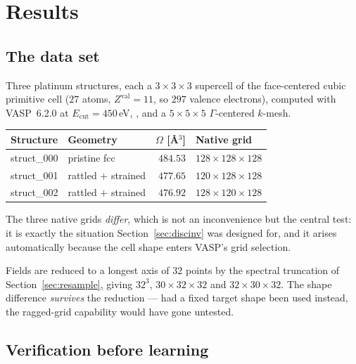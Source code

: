 \chapter{Results}
\label{ch:results}

\section{The data set}

Three platinum structures, each a $3\times3\times3$ supercell of the face-centered
cubic primitive cell ($27$ atoms, $Z^{\mathrm{val}}=11$, so $297$ valence
electrons), computed with VASP~6.2.0 at
$E_{\mathrm{cut}}=450$\,eV, , and a $5\times5\times5$
$\Gamma$-centered $k$-mesh.

\begin{center}
\begin{tabular}{@{}llrl@{}}
\toprule
Structure & Geometry & $\Omega$ [\AA$^3$] & Native grid \\
\midrule
struct\_000 & pristine fcc & $484.53$ & $128\times128\times128$ \\
struct\_001 & rattled $+$ strained & $477.65$ & $120\times128\times128$ \\
struct\_002 & rattled $+$ strained & $476.92$ & $128\times120\times128$ \\
\bottomrule
\end{tabular}
\end{center}

The three native grids \emph{differ}, which is not an inconvenience but the
central test: it is exactly the situation Section~\ref{sec:discinv} was designed
for, and it arises automatically because the cell shape enters VASP's grid
selection.

\begin{ptip}
Fields are reduced to a longest axis of $32$ points by the spectral truncation
of Section~\ref{sec:resample}, giving $32^3$, $30\times32\times32$ and
$32\times30\times32$. The shape difference \emph{survives} the reduction --- had
a fixed target shape been used instead, the ragged-grid capability would have
gone untested.
\end{ptip}

\section{Verification before learning}

